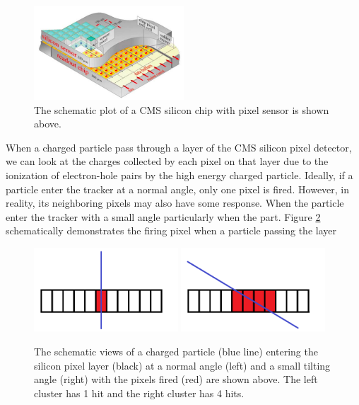 \begin{figure}[hbtp]
\begin{center}
\includegraphics[width=0.50\textwidth]{Figures/Chapter4/CMSPixChip.png}
\caption{The schematic plot of a CMS silicon chip with pixel sensor is shown above.}
\label{CMSPixChip}
\end{center}
\end{figure} 

When a charged particle pass through a layer of the CMS silicon pixel detector, we can look at the charges collected by each pixel on that layer due to the ionization of electron-hole pairs by the high energy charged particle. Ideally, if a particle enter the tracker at a normal angle, only one pixel is fired. However, in reality, its neighboring pixels may also have some response. When the particle enter the tracker with a small angle  particularly when the part. Figure \ref{HitDemo} schematically demonstrates the firing pixel when a particle passing the layer

\begin{figure}[hbtp]
\begin{center}
\includegraphics[width=0.48\textwidth]{Figures/Chapter4/Hit1.png}
\includegraphics[width=0.48\textwidth]{Figures/Chapter4/Hit2.png}
\caption{The schematic views of a charged particle (blue line) entering the silicon pixel layer (black) at a normal angle (left) and a small tilting angle (right) with the pixels fired (red) are shown above. The left cluster has 1 hit and the right cluster has 4 hits.}
\label{HitDemo}
\end{center}
\end{figure} 

